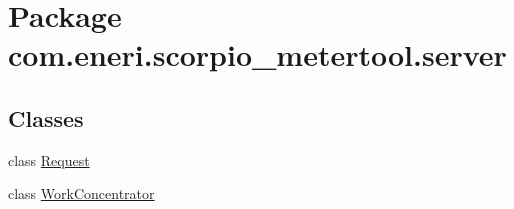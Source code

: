 \hypertarget{namespacecom_1_1eneri_1_1scorpio__metertool_1_1server}{}\section{Package com.\+eneri.\+scorpio\+\_\+metertool.\+server}
\label{namespacecom_1_1eneri_1_1scorpio__metertool_1_1server}
\subsection*{Classes}
\begin{DoxyCompactItemize}
\item 
class \hyperlink{classcom_1_1eneri_1_1scorpio__metertool_1_1server_1_1_request}{Request}
\item 
class \hyperlink{classcom_1_1eneri_1_1scorpio__metertool_1_1server_1_1_work_concentrator}{Work\+Concentrator}
\end{DoxyCompactItemize}
